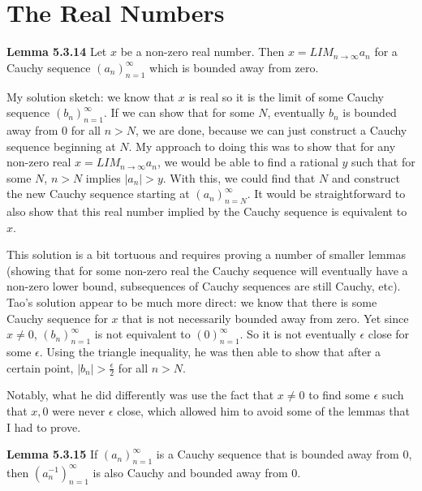\documentclass[answers,12pt]{exam}
\begin{document}
\section{The Real Numbers}

\textbf{Lemma 5.3.14} 
Let $x$ be a non-zero real number. Then $x= LIM_{n \to \infty} a_n$ for a Cauchy sequence ${(a_n)}_{n=1}^{\infty}$ which is bounded away from zero.

\begin{solution}
    My solution sketch: we know that $x$ is real so it is the limit of some Cauchy sequence ${(b_n)}_{n=1}^{\infty}$.
    If we can show that for some $N$, eventually $b_n$ is bounded away from $0$ for all $n > N$, we are done, because we can just construct a Cauchy sequence beginning at $N$.
    My approach to doing this was to show that for any non-zero real $x = LIM_{n \to \infty}a_n$, we would be able to find a rational $y$ such that for some $N$, $n>N$ implies $|a_n|>y$.
    With this, we could find that $N$ and construct the new Cauchy sequence starting at ${(a_n)}_{n=N}^{\infty}$.
    It would be straightforward to also show that this real number implied by the Cauchy sequence is equivalent to $x$.

    This solution is a bit tortuous and requires proving a number of smaller lemmas (showing that for some non-zero real the Cauchy sequence will eventually have a non-zero lower bound, subsequences of Cauchy sequences are still Cauchy, etc).
    Tao's solution appear to be much more direct:
    we know that there is some Cauchy sequence for $x$ that is not necessarily bounded away from zero.
    Yet since $x \neq 0$, ${(b_n)}_{n=1}^{\infty}$ is not equivalent to ${(0)}_{n=1}^{\infty}$.
    So it is not eventually $\epsilon$ close for some $\epsilon$.
    Using the triangle inequality, he was then able to show that after a certain point, $|b_n|> \frac{\epsilon}{2}$ for all $n>N$.

    Notably, what he did differently was use the fact that $x \neq 0$ to find some $\epsilon$ such that $x, 0$ were never $\epsilon$ close, which allowed him to avoid some of the lemmas that I had to prove.
\end{solution}

\textbf{Lemma 5.3.15} 
If ${(a_n)}_{n=1}^{\infty}$ is a Cauchy sequence that is bounded away from 0, then ${(a_n^{-1})_{n=1}^{\infty}}$ is also Cauchy and bounded away from 0.
\end{document}
